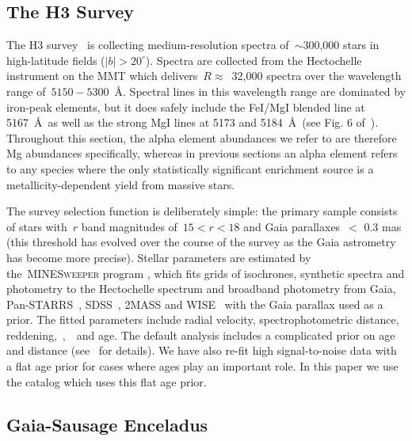 \documentclass[ms.tex]{subfiles}
\begin{document}
\subsection{The H3 Survey}
\label{sec:h3:survey}

The H3 survey~\citep{Conroy2019} is collecting medium-resolution spectra
of~$\sim$300,000 stars in high-latitude fields ($\left|b\right| > 20^\circ$).
Spectra are collected from the Hectochelle instrument on the MMT
\citep{Szentgyorgyi2011} which delivers~$R \approx$~32,000 spectra over the
wavelength range of~$5150 - 5300$~\AA.
Spectral lines in this wavelength range are dominated by iron-peak elements,
but it does safely include the FeI/MgI blended line at 5167~\AA~as well as
the strong MgI lines at 5173 and 5184~\AA~(see Fig. 6 of~\citealt{Conroy2019}).
Throughout this section, the alpha element abundances we refer to are therefore
Mg abundances specifically, whereas in previous sections an alpha element
refers to any species where the only statistically significant enrichment
source is a metallicity-dependent yield from massive stars.
\par
The survey selection function is deliberately simple: the primary sample
consists of stars with~$r$ band magnitudes of~$15 < r < 18$ and Gaia
\citet{Gaia2016} parallaxes~$<$ 0.3 mas (this threshold has evolved over the
course of the survey as the Gaia astrometry has become more precise).
Stellar parameters are estimated by the~\textsc{MINESweeper} program
\citep{Cargile2020}, which fits grids of isochrones, synthetic spectra and
photometry to the Hectochelle spectrum and broadband photometry from Gaia,
Pan-STARRS~\citep{Chambers2016}, SDSS~\citep{York2000}, 2MASS
\citep{Skrutskie2006} and WISE~\citep{Wright2010} with the Gaia parallax
used as a prior.
The fitted parameters include radial velocity, spectrophotometric distance,
reddening,~\feh,~\afe~and age.
The default analysis includes a complicated prior on age and distance
(see~\citealt{Cargile2020} for details).
We have also re-fit high signal-to-noise data with a flat age prior for cases
where ages play an important role.
In this paper we use the catalog which uses this flat age prior.


\subsection{Gaia-Sausage Enceladus}
\label{sec:h3:gse}


\end{document}
